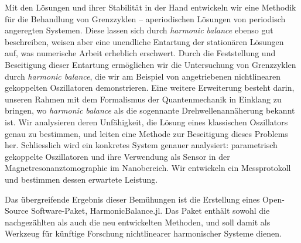 Mit den Lösungen und ihrer Stabilität in der Hand entwickeln wir eine Methodik für die Behandlung von Grenzzyklen – aperiodischen Lösungen von periodisch angeregten Systemen. Diese lassen sich durch \textit{harmonic balance} ebenso gut beschreiben, weisen aber eine unendliche Entartung der stationären Lösungen auf, was numerische Arbeit erheblich erschwert. Durch die Feststellung und Beseitigung dieser Entartung ermöglichen wir die Untersuchung von Grenzzyklen durch \textit{harmonic balance}, die wir am Beispiel von angetriebenen nichtlinearen gekoppelten Oszillatoren demonstrieren. Eine weitere Erweiterung besteht darin, unseren Rahmen mit dem Formalismus der Quantenmechanik in Einklang zu bringen, wo \textit{harmonic balance} als die sogennante Drehwellenannäherung bekannt ist. Wir analysieren deren Unfähigkeit, die Lösung eines klassischen Oszillators genau zu bestimmen, und leiten eine Methode zur Beseitigung dieses Problems her. Schliesslich wird ein konkretes System genauer analysiert: parametrisch gekoppelte Oszillatoren und ihre Verwendung als Sensor in der Magnetresonanztomographie im Nanobereich. Wir entwickeln ein Messprotokoll und bestimmen dessen erwartete Leistung.

Das übergreifende Ergebnis dieser Bemühungen ist die Erstellung eines Open-Source Software-Paket, HarmonicBalance.jl. Das Paket enthält sowohl die nachgezählten als auch die neu entwickelten Methoden, und soll damit als Werkzeug für künftige Forschung nichtlinearer harmonischer Systeme dienen. 
